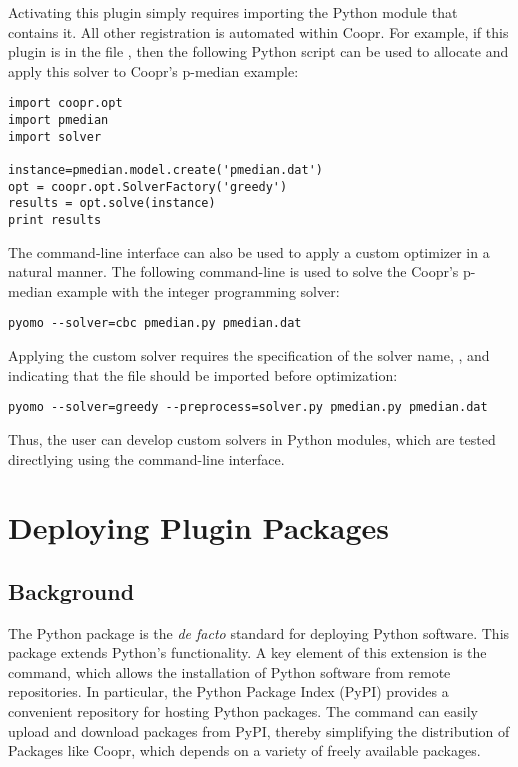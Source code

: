 Activating this plugin simply requires importing the Python module that 
contains it.  All other registration is automated within Coopr.  For example, if
this plugin is in the file , then the following Python script 
can be used to allocate and apply this solver to Coopr's p-median example:
\begin{lstlisting}
import coopr.opt
import pmedian
import solver

instance=pmedian.model.create('pmedian.dat')
opt = coopr.opt.SolverFactory('greedy')
results = opt.solve(instance)
print results
\end{lstlisting}

The  command-line interface can also be used to apply a
custom optimizer in a natural manner.  The following command-line is 
used to solve the Coopr's p-median example with the  integer programming solver:
\begin{lstlisting}
pyomo --solver=cbc pmedian.py pmedian.dat
\end{lstlisting}
Applying the custom solver requires the specification of the solver name, , and indicating that the  file should be 
imported before optimization:
\begin{lstlisting}
pyomo --solver=greedy --preprocess=solver.py pmedian.py pmedian.dat
\end{lstlisting}
Thus, the user can develop custom solvers in Python modules, which are tested directlying using the  command-line interface.


\section{Deploying Plugin Packages}

\subsection{Background}

The Python  package is the \textit{de facto}
standard for deploying Python software.  This package extends Python's
 functionality.  A key element of this extension is the
 command, which allows the installation of Python
software from remote repositories.  In particular, the Python Package
Index (PyPI) provides a convenient repository for hosting Python packages.
The  command can easily upload and download packages
from PyPI, thereby simplifying the distribution of Packages like Coopr,
which depends on a variety of freely available packages.

